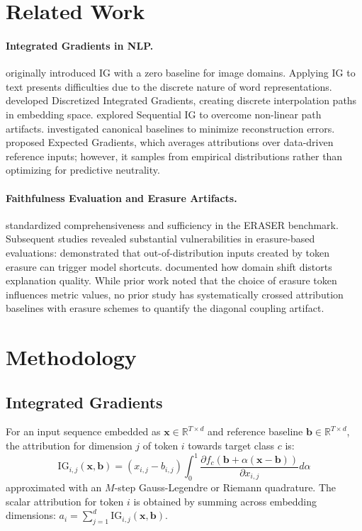 \documentclass[11pt]{article}
\begin{document}
\section{Related Work}
\label{sec:related}

\paragraph{Integrated Gradients in NLP.}
\citet{sundararajan2017axiomatic} originally introduced IG with a zero baseline for image domains. Applying IG to text presents difficulties due to the discrete nature of word representations. \citet{sanyal2021discretized} developed Discretized Integrated Gradients, creating discrete interpolation paths in embedding space. \citet{enguehard2023sequential} explored Sequential IG to overcome non-linear path artifacts. \citet{hentschel2024canonical} investigated canonical baselines to minimize reconstruction errors. \citet{erion2021improving} proposed Expected Gradients, which averages attributions over data-driven reference inputs; however, it samples from empirical distributions rather than optimizing for predictive neutrality.

\paragraph{Faithfulness Evaluation and Erasure Artifacts.}
\citet{deyoung2020eraser} standardized comprehensiveness and sufficiency in the ERASER benchmark. Subsequent studies revealed substantial vulnerabilities in erasure-based evaluations: \citet{bastings2022shortcuts} demonstrated that out-of-distribution inputs created by token erasure can trigger model shortcuts. \citet{chrysostomou2022empirical} documented how domain shift distorts explanation quality. While prior work noted that the choice of erasure token influences metric values, no prior study has systematically crossed attribution baselines with erasure schemes to quantify the diagonal coupling artifact.

\section{Methodology}
\label{sec:method}

\subsection{Integrated Gradients}
For an input sequence embedded as $\mathbf{x} \in \mathbb{R}^{T \times d}$ and reference baseline $\mathbf{b} \in \mathbb{R}^{T \times d}$, the attribution for dimension $j$ of token $i$ towards target class $c$ is:
\begin{equation}
\text{IG}_{i,j}(\mathbf{x}, \mathbf{b}) = (x_{i,j} - b_{i,j}) \int_0^1 \frac{\partial f_c(\mathbf{b} + \alpha(\mathbf{x} - \mathbf{b}))}{\partial x_{i,j}} d\alpha
\end{equation}
approximated with an $M$-step Gauss-Legendre or Riemann quadrature. The scalar attribution for token $i$ is obtained by summing across embedding dimensions: $a_i = \sum_{j=1}^d \text{IG}_{i,j}(\mathbf{x}, \mathbf{b})$.
\end{document}
